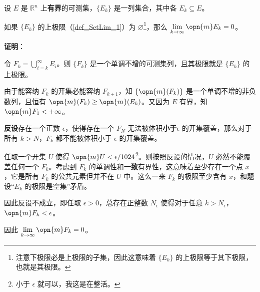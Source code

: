 



\begin{lemma}{}\label{lem_EgrfTh_1}
设 $E$ 是 $\mathbb{R}^n$ 上\textbf{有界}的可测集，$\{E_k\}$ 是一列集合，其中各 $E_k\subseteq E$。

如果 $\{E_k\}$ 的上极限（\autoref{def_SetLim_1}）为 $\varnothing$\footnote{注意下极限必是上极限的子集，因此这意味着 $\{E_k\}$ 的上极限等于其下极限，也就是其极限。}，那么 $\lim\limits_{k\to\infty}\opn{m}E_k=0$。
\end{lemma}

\textbf{证明}：

令 $F_k=\bigcup_{i=k}^\infty E_i$。则 $\{F_k\}$ 是一个单调不增的可测集列，且其极限就是 $\{E_k\}$ 的上极限。

由于能容纳 $F_k$ 的开集必能容纳 $F_{k+1}$，知 $\{\opn{m}(F_k)\}$ 是一个单调不增的非负数列，且恒有 $\opn{m}(F_k)\geq\opn{m}(E_k)$。又因为 $E$ 有界，知 $\opn{m}F_1<+\infty$。

\textbf{反设}存在一个正数 $\epsilon$，使得存在一个 $F_N$ 无法被体积\textbf{小于}$\epsilon$ 的开集覆盖，那么对于所有 $k>N$，$F_k$ 都不能被体积小于 $\epsilon$ 的开集覆盖。

任取一个开集 $U$ 使得 $\opn{m}U<\epsilon/1024$\footnote{小于 $\epsilon$ 就可以，我这是在整活。}。则按照反设的情况，$U$ 必然不能覆盖任何一个 $F_k$。考虑到 $F_k$ 的单调性和\textbf{一致}有界性，这意味着至少存在一个点 $x$，它是所有 $F_k$ 的公共元素但并不在 $U$ 中。这么一来 $F_k$ 的极限至少含有 $x$，和题设“$E_k$ 的极限是空集”矛盾。

因此反设不成立，即任取 $\epsilon>0$，总存在正整数 $N_\epsilon$ 使得对于任意 $k>N_\epsilon$，$\opn{m}F_k<\epsilon$。

因此 $\lim\limits_{k\to\infty}\opn{m}F_k=0$。

